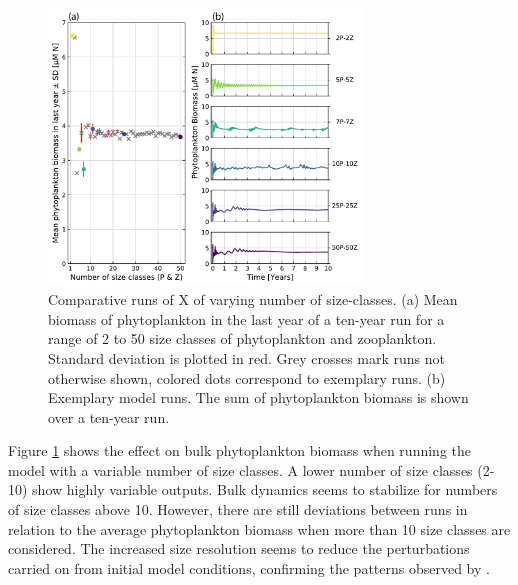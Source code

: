 \documentclass[journal abbreviation, manuscript]{copernicus}
\begin{document}
\begin{figure}[t]
\includegraphics[width=8.3cm]{Figures/firstdraft_plots/03_ASTroCAT_sizeclassrange.pdf}
\caption{Comparative runs of X of varying number of size-classes. (a) Mean biomass of phytoplankton in the last year of a ten-year run for a range of 2 to 50 size classes of phytoplankton and zooplankton. Standard deviation is plotted in red. Grey crosses mark runs not otherwise shown, colored dots correspond to exemplary runs. (b) Exemplary model runs. The sum of phytoplankton biomass is shown over a ten-year run.}
\label{Figure:ResultsASTroCAT_2}
\end{figure}

Figure \ref{Figure:ResultsASTroCAT_2} shows the effect on bulk phytoplankton biomass when running the model with a variable number of size classes. A lower number of size classes (2-10) show highly variable outputs. Bulk dynamics seems to stabilize for numbers of size classes above 10. However, there are still deviations between runs in relation to the average phytoplankton biomass when more than 10 size classes are considered. The increased size resolution seems to reduce the perturbations carried on from initial model conditions, confirming the patterns observed by \citet{Baird2010IncreasingErrors}.
\end{document}
